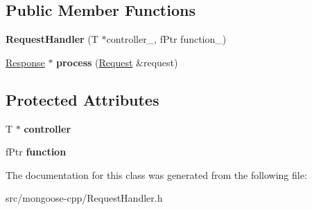\subsection*{Public Member Functions}
\begin{DoxyCompactItemize}
\item 
{\bfseries Request\+Handler} (T $\ast$controller\+\_\+, f\+Ptr function\+\_\+)\hypertarget{classMongoose_1_1RequestHandler_a3ed6c5be98e83f6c5397ad801f27e641}{}\label{classMongoose_1_1RequestHandler_a3ed6c5be98e83f6c5397ad801f27e641}

\item 
\hyperlink{classMongoose_1_1Response}{Response} $\ast$ {\bfseries process} (\hyperlink{classMongoose_1_1Request}{Request} \&request)\hypertarget{classMongoose_1_1RequestHandler_ad3db210e1a2721fbaa3b7fde62622cd8}{}\label{classMongoose_1_1RequestHandler_ad3db210e1a2721fbaa3b7fde62622cd8}

\end{DoxyCompactItemize}
\subsection*{Protected Attributes}
\begin{DoxyCompactItemize}
\item 
T $\ast$ {\bfseries controller}\hypertarget{classMongoose_1_1RequestHandler_ae2460dec40272b1d77bb87b7cea6189c}{}\label{classMongoose_1_1RequestHandler_ae2460dec40272b1d77bb87b7cea6189c}

\item 
f\+Ptr {\bfseries function}\hypertarget{classMongoose_1_1RequestHandler_af76ae0483fd74b71c02037a9e08fc1d9}{}\label{classMongoose_1_1RequestHandler_af76ae0483fd74b71c02037a9e08fc1d9}

\end{DoxyCompactItemize}


The documentation for this class was generated from the following file\+:\begin{DoxyCompactItemize}
\item 
src/mongoose-\/cpp/Request\+Handler.\+h\end{DoxyCompactItemize}

